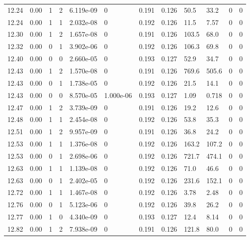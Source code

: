 \documentclass[preview]{standalone}
\begin{document}
{{{{{{{{{\begin{tabular}{L{1.2cm}C{1.2cm} C{0.3cm}C{0.5cm} C{1.4cm}C{1.4cm} C{1.4cm}C{1.4cm} C{1.6cm}C{1.6cm} C{1.6cm}C{1.6cm}}
  12.24  &  0.00  & 1     &  2 &  6.119e-09  & 0  &  0.191&   0.126& 50.5 & 33.2   &  0 & 0  \\ 
  12.24  &  0.00  & 1     &  1 &  2.032e-08  & 0  &  0.192&   0.126& 11.5 & 7.57   &  0 & 0  \\ 
  12.30  &  0.00  & 1     &  2 &  1.657e-08  & 0  &  0.191&   0.126& 103.5 & 68.0   &  0 & 0  \\ 
  12.32  &  0.00  & 0     &  1 &  3.902e-06  & 0  &  0.192&   0.126& 106.3 & 69.8   &  0 & 0  \\ 
  12.40  &  0.00  & 0     &  0 &  2.660e-05  & 0  &  0.193&   0.127& 52.9 & 34.7   &  0 & 0  \\ 
  12.43  &  0.00  & 1     &  2 &  1.570e-08  & 0  &  0.191&   0.126& 769.6 & 505.6   &  0 & 0  \\ 
  12.43  &  0.00  & 0     &  1 &  1.738e-05  & 0  &  0.192&   0.126& 21.5 & 14.1   &  0 & 0  \\ 
  12.43  &  0.00  & 0     &  0 &  8.570e-05  & 1.000e-06  &  0.193&   0.127& 1.09 & 0.718   &  0 & 0  \\ 
  12.47  &  0.00  & 1     &  2 &  3.739e-09  & 0  &  0.191&   0.126& 19.2 & 12.6   &  0 & 0  \\ 
  12.48  &  0.00  & 1     &  1 &  2.454e-08  & 0  &  0.192&   0.126& 53.8 & 35.3   &  0 & 0  \\ 
  12.51  &  0.00  & 1     &  2 &  9.957e-09  & 0  &  0.191&   0.126& 36.8 & 24.2   &  0 & 0  \\ 
  12.53  &  0.00  & 1     &  1 &  1.376e-08  & 0  &  0.192&   0.126& 163.2 & 107.2   &  0 & 0  \\ 
  12.53  &  0.00  & 0     &  1 &  2.698e-06  & 0  &  0.192&   0.126& 721.7 & 474.1   &  0 & 0  \\ 
  12.63  &  0.00  & 1     &  1 &  1.139e-08  & 0  &  0.192&   0.126& 71.0 & 46.6   &  0 & 0  \\ 
  12.63  &  0.00  & 0     &  1 &  2.402e-05  & 0  &  0.192&   0.126& 231.6 & 152.1   &  0 & 0  \\ 
  12.72  &  0.00  & 1     &  1 &  1.467e-08  & 0  &  0.192&   0.126& 3.78 & 2.48   &  0 & 0  \\ 
  12.76  &  0.00  & 0     &  1 &  5.123e-06  & 0  &  0.192&   0.126& 39.8 & 26.2   &  0 & 0  \\ 
  12.77  &  0.00  & 1     &  0 &  4.340e-09  & 0  &  0.193&   0.127& 12.4 & 8.14   &  0 & 0  \\ 
  12.82  &  0.00  & 1     &  2 &  7.938e-09  & 0  &  0.191&   0.126& 121.8 & 80.0   &  0 & 0  \\ 

\end{tabular}}}}}}}}}}
\end{document}
